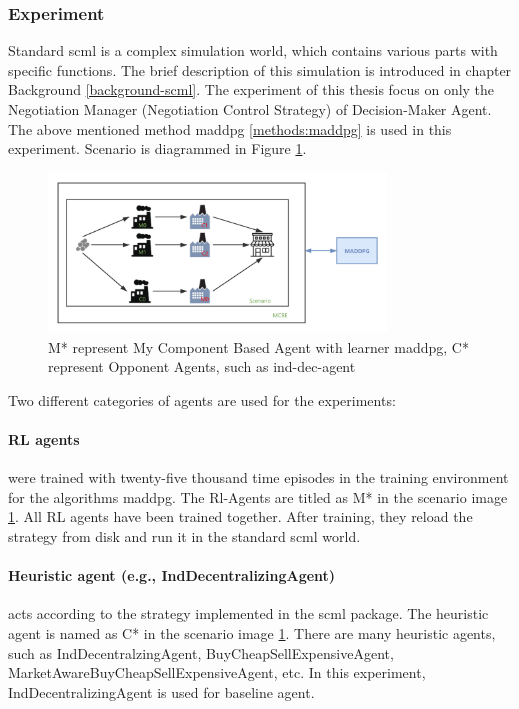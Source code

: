 \subsubsection{Experiment}
Standard \gls{scml} is a complex simulation world, which contains various parts with specific functions. The brief description of this simulation is introduced in chapter Background \ref{background-scml}. The experiment of this thesis focus on only the Negotiation Manager (Negotiation Control Strategy) of Decision-Maker Agent. The above mentioned method maddpg \ref{methods:maddpg} is used in this experiment. 
Scenario is diagrammed in Figure \ref{fig:scenario-standard-scml}.

\begin{figure}[htbp]
\centering
\includegraphics[width=0.80\textwidth]{./images/scenario-standard-scml.png}
\caption{M* represent My Component Based Agent with learner \gls{maddpg}, C* represent Opponent Agents, such as \gls{ind-dec-agent}}
\label{fig:scenario-standard-scml}
\end{figure}

Two different categories of agents are used for the experiments:
\paragraph{RL agents} were trained with twenty-five thousand time episodes in the training environment for the algorithms maddpg. The Rl-Agents are titled as M* in the scenario image \ref{fig:scenario-standard-scml}. All RL agents have been trained together. After training, they reload the strategy from disk and run it in the standard scml world.

\paragraph{Heuristic agent (e.g., IndDecentralizingAgent)} acts according to the strategy implemented in the scml package. The heuristic agent is named as C* in the scenario image \ref{fig:scenario-standard-scml}. There are many heuristic agents, such as IndDecentralzingAgent, BuyCheapSellExpensiveAgent, MarketAwareBuyCheapSellExpensiveAgent, etc. In this experiment, IndDecentralizingAgent is used for baseline agent.

